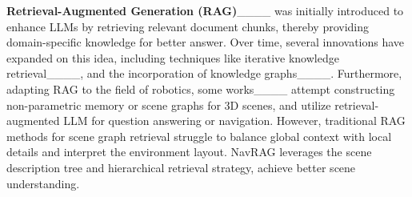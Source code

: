 \noindent \textbf{Retrieval-Augmented Generation (RAG)}____  was initially introduced to enhance LLMs by retrieving relevant document chunks, thereby providing domain-specific knowledge for better answer. Over time, several innovations have expanded on this idea, including techniques like iterative knowledge retrieval____, and the incorporation of knowledge graphs____. Furthermore, adapting RAG to the field of robotics, some works____ attempt constructing non-parametric memory or scene graphs for 3D scenes, and utilize retrieval-augmented LLM for question answering or navigation. However, traditional RAG methods for scene graph retrieval struggle to balance global context with local details and interpret the environment layout. NavRAG leverages the scene description tree and hierarchical retrieval strategy, achieve better scene understanding.